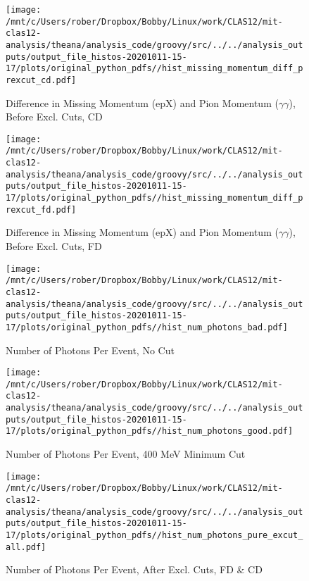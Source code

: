 \documentclass{article}
\begin{document}
\begin{landscape}
\begin{figure}[h]
        \texttt{[image: /mnt/c/Users/rober/Dropbox/Bobby/Linux/work/CLAS12/mit-clas12-analysis/theana/analysis\_code/groovy/src/../../analysis\_outputs/output\_file\_histos-20201011-15-17/plots/original\_python\_pdfs//hist\_missing\_momentum\_diff\_prexcut\_cd.pdf]}
        \captionsetup{textformat=empty,labelformat=blank}
        \caption{Difference in Missing Momentum (epX) and Pion Momentum ($\gamma$$\gamma$), Before Excl. Cuts, CD}
    \end{figure}
    \clearpage
    
    \begin{figure}[h]
        \centering

        \texttt{[image: /mnt/c/Users/rober/Dropbox/Bobby/Linux/work/CLAS12/mit-clas12-analysis/theana/analysis\_code/groovy/src/../../analysis\_outputs/output\_file\_histos-20201011-15-17/plots/original\_python\_pdfs//hist\_missing\_momentum\_diff\_prexcut\_fd.pdf]}
        \captionsetup{textformat=empty,labelformat=blank}
        \caption{Difference in Missing Momentum (epX) and Pion Momentum ($\gamma$$\gamma$), Before Excl. Cuts, FD}
    \end{figure}
    \clearpage
    
    \begin{figure}[h]
        \centering

        \texttt{[image: /mnt/c/Users/rober/Dropbox/Bobby/Linux/work/CLAS12/mit-clas12-analysis/theana/analysis\_code/groovy/src/../../analysis\_outputs/output\_file\_histos-20201011-15-17/plots/original\_python\_pdfs//hist\_num\_photons\_bad.pdf]}
        \captionsetup{textformat=empty,labelformat=blank}
        \caption{Number of Photons Per Event, No Cut}
    \end{figure}
    \clearpage
    
    \begin{figure}[h]
        \centering

        \texttt{[image: /mnt/c/Users/rober/Dropbox/Bobby/Linux/work/CLAS12/mit-clas12-analysis/theana/analysis\_code/groovy/src/../../analysis\_outputs/output\_file\_histos-20201011-15-17/plots/original\_python\_pdfs//hist\_num\_photons\_good.pdf]}
        \captionsetup{textformat=empty,labelformat=blank}
        \caption{Number of Photons Per Event, 400 MeV Minimum Cut}
    \end{figure}
    \clearpage
    
    \begin{figure}[h]
        \centering

        \texttt{[image: /mnt/c/Users/rober/Dropbox/Bobby/Linux/work/CLAS12/mit-clas12-analysis/theana/analysis\_code/groovy/src/../../analysis\_outputs/output\_file\_histos-20201011-15-17/plots/original\_python\_pdfs//hist\_num\_photons\_pure\_excut\_all.pdf]}
        \captionsetup{textformat=empty,labelformat=blank}
        \caption{Number of Photons Per Event, After Excl. Cuts, FD \& CD}
    \end{figure}
    \clearpage
    

\end{landscape}
\end{document}
